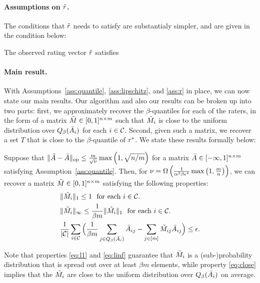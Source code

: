 \paragraph{Assumptions on $\tilde{r}$.}
The conditions that $\tilde{r}$ needs to satisfy are substantialy simpler, and 
are given in the condition below:
\begin{assumption}
\label{ass:r}
The observed rating vector $\tilde{r}$ satisfies 
\end{assumption}

\paragraph{Main result.}
With Assumptions~\ref{ass:quantile}, \ref{ass:lipschitz}, and \ref{ass:r} 
in place, we can now state our main results. Our algorithm and also our results 
can be broken up into two parts: first, we approximately recover the 
$\beta$-quantiles for each of the raters, in the form of a matrix 
$\tilde{M} \in [0,1]^{n \times m}$ such that $\tilde{M}_i$ is close to the uniform distribution 
over $Q_{\beta}(\bar{A}_i)$ for each $i \in \mathcal{C}$. Second, given such a matrix, 
we recover a set $T$ that is close to the $\beta$-quantile of $r^*$. 
We state these results formally below:
\begin{theorem}
\label{thm:main-M}
Suppose that 
$\|\tilde{A} - \bar{A}\|_{\mathrm{op}} \leq \frac{m}{\sqrt{\nu}}\max\left( 1, \sqrt{n/m} \right)$ for a 
matrix $\bar{A} \in [-\infty,1]^{n \times m}$ satisfying 
Assumption~\ref{ass:quantile}. Then, for 
$\nu = \Omega\left( \frac{1}{\alpha^3\beta\epsilon^4}\max\left( 1,\frac{m}{n} \right) \right)$, we can 
recover a matrix $\tilde{M} \in [0,1]^{n \times m}$ satisfying the following 
properties:
\begin{align}
\label{eq:l1} &\|\tilde{M}_i\|_1 \leq 1 \text{ \ for each $i \in \mathcal{C}$.} \\
\label{eq:linf} &\|\tilde{M}_i\|_{\infty} \leq \frac{1}{\beta m}\|\tilde{M}_i\|_1 \text{ \ for each $i \in \mathcal{C}$.} \\
\label{eq:close} &\frac{1}{|\mathcal{C}|}\sum_{i \in \mathcal{C}}\Big(\frac{1}{\beta m}\sum_{j \in Q_{\beta}(\bar{A}_i)} \bar{A}_{ij} - \sum_{j \in [m]} \tilde{M}_{ij}\bar{A}_{ij}\Big) \leq \epsilon.
\end{align}
\end{theorem}
Note that properties \eqref{eq:l1} and \eqref{eq:linf} guarantee that $\tilde{M}_i$ is a 
(sub-)probability distribution that is spread out over at least $\beta m$ 
elements, while property \eqref{eq:close} implies that the $\tilde{M}_i$ are close to 
the uniform distribution over $Q_{\beta}(\bar{A}_i)$ on average.

